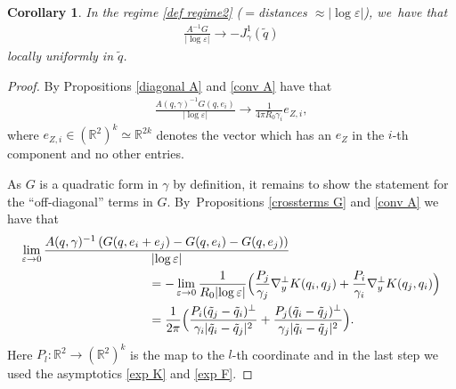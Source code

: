 \documentclass[JEP,XML,SOM,Unicode,published]{cedram}
\let\epsilon\varepsilon
\newtheorem{corollary}[theorem]{Corollary}
\theoremstyle{definition}
\newcommand\R{\mathbb{R}}
\let\eps\epsilon
\let\mel\relax
\begin{document}
\begin{corollary}\label{conv J1}
In the regime \eqref{def regime2} (${}={}$distances $\approx|{\log\eps}|$), we~have that
\begin{align*}
\frac{A^{-1}G}{|{\log\eps}|}\to -J_\gamma^1(\tilde{q})
\end{align*}
locally uniformly in $\tilde{q}$.
\end{corollary}
\begin{proof}
By Propositions \ref{diagonal A} and \ref{conv A} have that
\begin{align*}
\frac{{A(q,\gamma)}^{-1}G(q,e_i)}{|{\log\eps}|}\to \frac{1}{4\pi R_0\gamma_i}e_{Z,i},
\end{align*}
where $e_{Z,i}\in (\R^2)^k\simeq \R^{2k}$ denotes the vector which has an $e_Z$ in the $i$-th component and no other entries.

As $G$ is a quadratic form in $\gamma$ by definition, it remains to show the statement for the ``off-diagonal'' terms in $G$. By~Propositions \ref{crossterms G} and \ref{conv A} we have that
\begin{align*}
\mel\lim_{\eps\to 0}\frac{A(q,\gamma)^{-1}\left(G(q,e_i+e_j)-G(q,e_i)-G(q,e_j)\right)}{|{\log\eps}|}&\\
&\hspace*{-4cm}=- \lim_{\eps\to 0}\frac{1}{R_0|{\log\eps}|} \Bigl(\frac{P_j}{\gamma_j}\nabla_y^\perp K(q_i,q_j)+\frac{P_i}{\gamma_i}\nabla_y^\perp K(q_j,q_i) \Bigr)\\
&\hspace*{-4cm}= \frac{1}{2\pi} \Bigl(\frac{P_i(\tilde{q}_j-\tilde{q}_i)^\perp}{\gamma_i|\tilde{q}_i-\tilde{q}_j|^2}+\frac{P_j(\tilde{q}_i-\tilde{q}_j)^\perp}{\gamma_j|\tilde{q}_i-\tilde{q}_j|^2} \Bigr).
\end{align*}
Here $P_l:\R^2\to (\R^2)^k$ is the map to the $l$-th coordinate and in the last step we used the asymptotics \eqref{exp K} and \eqref{exp F}.
\end{proof}
\end{document}
